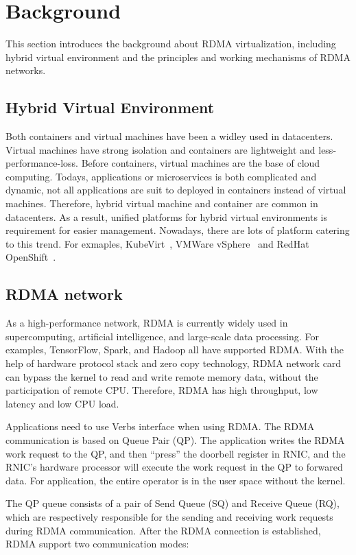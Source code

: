 \section{Background}
This section introduces the background about RDMA virtualization, including hybrid virtual environment and the principles and working mechanisms of RDMA networks.

\subsection{Hybrid Virtual Environment}	
Both containers and virtual machines have been a widley used in datacenters. Virtual machines have strong isolation and containers are lightweight and less-performance-loss. Before containers, virtual machines are the base of cloud computing. Todays, applications or microservices is both complicated and dynamic, not all applications are suit to deployed in containers instead of virtual machines. Therefore, hybrid virtual machine and container are common in datacenters. As a result, unified platforms for hybrid virtual environments is requirement for easier management. Nowadays, there are lots of platform catering to this trend. For exmaples, KubeVirt~\cite{kubervirt}, VMWare vSphere~\cite{vsphere} and RedHat OpenShift~\cite{openshift}.

\subsection{RDMA network}
As a high-performance network, RDMA is currently widely used in supercomputing, artificial intelligence, and large-scale data processing. For examples, TensorFlow, Spark, and Hadoop all have supported RDMA. With the help of hardware protocol stack and zero copy technology, RDMA network card can bypass the kernel to read and write remote memory data, without the participation of remote CPU. Therefore, RDMA has high throughput, low latency and low CPU load.

Applications need to use Verbs interface when using RDMA. The RDMA  communication is based on Queue Pair (QP). The application writes the RDMA work request to the QP, and then ``press''  the doorbell register in RNIC, and the RNIC's hardware processor will execute the work request in the QP to forwared data. For application, the entire operator is in the user space without the kernel.

The QP queue consists of a pair of Send Queue (SQ) and Receive Queue (RQ), which are respectively responsible for the sending and receiving work requests during RDMA communication. After the RDMA connection is established, RDMA support two communication modes:

